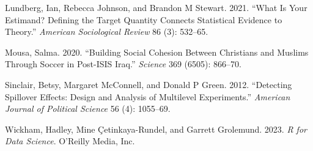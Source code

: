 \documentclass[
  10pt,
  a4paper,10pt]{extarticle}
\newlength{\cslhangindent}
\newenvironment{CSLReferences}[2] %
 {\begin{list}{}{%
  \setlength{\itemindent}{0pt}
  \setlength{\leftmargin}{0pt}
  \setlength{\parsep}{0pt}
  \ifodd #1
   \setlength{\leftmargin}{\cslhangindent}
   \setlength{\itemindent}{-1\cslhangindent}
  \fi
  \setlength{\itemsep}{#2\baselineskip}}}
 {\end{list}}
\begin{document}
\begin{CSLReferences}{1}{0}
Lundberg, Ian, Rebecca Johnson, and Brandon M Stewart. 2021. {``What Is
Your Estimand? Defining the Target Quantity Connects Statistical
Evidence to Theory.''} \emph{American Sociological Review} 86 (3):
532--65.

Mousa, Salma. 2020. {``Building Social Cohesion Between Christians and
Muslims Through Soccer in Post-ISIS Iraq.''} \emph{Science} 369 (6505):
866--70.

Sinclair, Betsy, Margaret McConnell, and Donald P Green. 2012.
{``Detecting Spillover Effects: Design and Analysis of Multilevel
Experiments.''} \emph{American Journal of Political Science} 56 (4):
1055--69.

Wickham, Hadley, Mine Çetinkaya-Rundel, and Garrett Grolemund. 2023.
\emph{R for Data Science}. {O'Reilly Media, Inc.}

\end{CSLReferences}
\end{document}

